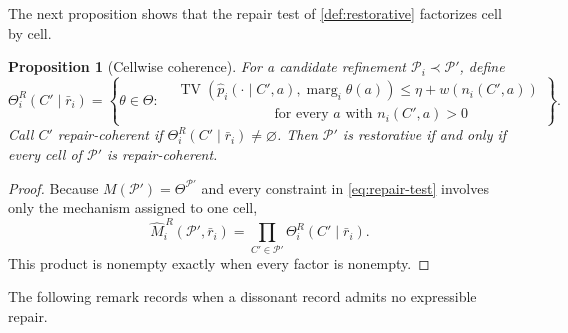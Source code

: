 \documentclass[11pt]{article}
\newtheorem{proposition}[assumption]{Proposition}
\theoremstyle{definition}
\newcommand{\emptysetset}{\varnothing}
\newcommand{\TV}{\operatorname{TV}}
\newcommand{\marg}[1]{\operatorname{marg}_{#1}}
\begin{document}
The next proposition shows that the repair test of \cref{def:restorative} factorizes cell by cell.

\begin{proposition}[Cellwise coherence]
\label{prop:coherence}
For a candidate refinement $\mathcal P_i\prec\mathcal P'$, define
\[
\Theta_i^{R}(C'\mid\bar r_i)
=
\left\{
\theta\in\Theta:
\begin{aligned}
&\TV\!\left(
  \hat p_i(\cdot\mid C',a),\marg{i}\theta(a)
 \right)
 \leq \eta+w\!\left(n_i(C',a)\right)\\[-0.2em]
&\hspace{7em}\text{for every $a$ with }n_i(C',a)>0
\end{aligned}
\right\}.
\]
Call $C'$ \emph{repair-coherent} if $\Theta_i^{R}(C'\mid\bar r_i)\neq\emptysetset$.
Then $\mathcal P'$ is restorative if and only if every cell of $\mathcal P'$ is repair-coherent.
\end{proposition}

\begin{proof}
Because $M(\mathcal P')=\Theta^{\mathcal P'}$ and every constraint in \cref{eq:repair-test} involves only the mechanism assigned to one cell,
\[
\widehat M_i^{\,R}(\mathcal P',\bar r_i)
=
\prod_{C'\in\mathcal P'}
\Theta_i^{R}(C'\mid\bar r_i).
\]
This product is nonempty exactly when every factor is nonempty.
\end{proof}

The following remark records when a dissonant record admits no expressible repair.
\end{document}
